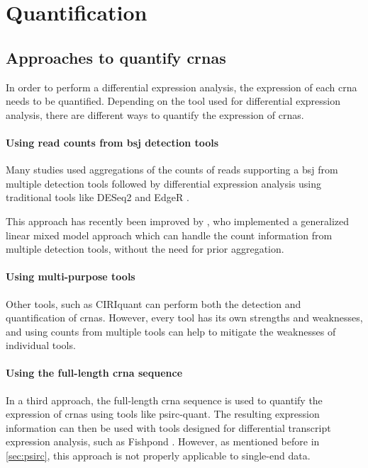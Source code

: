 \section{Quantification}

\subsection{Approaches to quantify \gls{crna}s}
In order to perform a differential expression analysis, the expression of each
\gls{crna} needs to be quantified.
Depending on the tool used for differential expression analysis, there are
different ways to quantify the expression of \gls{crna}s.

\paragraph{Using read counts from \gls{bsj} detection tools}
Many studies used aggregations of the counts of reads supporting a \gls{bsj}
from multiple detection tools followed by differential expression analysis
using traditional tools like DESeq2 and EdgeR
\supercite{digby_nf-corecircrna_2023,gaffo_sensitive_2022,love_moderated_2014,robinson_edger_2010}.

This approach has recently been improved by \textcite{buratin_detecting_2022},
who implemented a generalized linear mixed model approach which can handle the
count information from multiple detection tools, without the need for prior
aggregation\supercite{digby_computational_2024}.

\paragraph{Using multi-purpose tools}
Other tools, such as CIRIquant can perform both the detection and
quantification of \gls{crna}s\supercite{zhang_accurate_2020}.
However, every tool has its own strengths and weaknesses, and using counts from
multiple tools can help to mitigate the weaknesses of individual tools.

\paragraph{Using the full-length \gls{crna} sequence}
In a third approach, the full-length \gls{crna} sequence is used to quantify
the expression of \gls{crna}s using tools like
psirc-quant\supercite{yu_quantifying_2021}.
The resulting expression information can then be used with tools designed for
differential transcript expression analysis, such as Fishpond
\supercite{love_swimming_2018}.
However, as mentioned before in \cref{sec:psirc}, this approach is not properly
applicable to single-end data.

